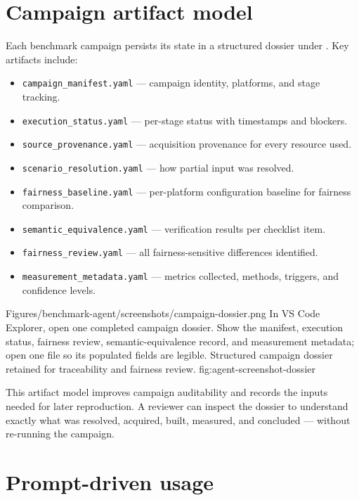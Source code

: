 \section{Campaign artifact model}
\label{sec:agent-artifacts}

Each benchmark campaign persists its state in a structured dossier under
. Key artifacts include:

\begin{itemize}
\item \texttt{campaign\_manifest.yaml} --- campaign identity, platforms, and stage tracking.
\item \texttt{execution\_status.yaml} --- per-stage status with timestamps and blockers.
\item \texttt{source\_provenance.yaml} --- acquisition provenance for every resource used.
\item \texttt{scenario\_resolution.yaml} --- how partial input was resolved.
\item \texttt{fairness\_baseline.yaml} --- per-platform configuration baseline for fairness comparison.
\item \texttt{semantic\_equivalence.yaml} --- verification results per checklist item.
\item \texttt{fairness\_review.yaml} --- all fairness-sensitive differences identified.
\item \texttt{measurement\_metadata.yaml} --- metrics collected, methods, triggers, and confidence levels.
\end{itemize}

\reportscreenshot
	{Figures/benchmark-agent/screenshots/campaign-dossier.png}
	{In VS Code Explorer, open one completed campaign dossier. Show the manifest, execution status, fairness review, semantic-equivalence record, and measurement metadata; open one file so its populated fields are legible.}
	{Structured campaign dossier retained for traceability and fairness review.}
	{fig:agent-screenshot-dossier}

This artifact model improves campaign auditability and records the inputs needed for later
reproduction. A reviewer can inspect
the dossier to understand exactly what was resolved, acquired, built, measured, and
concluded --- without re-running the campaign.

\section{Prompt-driven usage}
\label{sec:agent-prompts}

